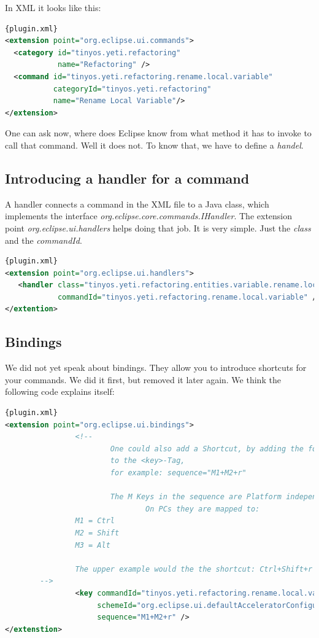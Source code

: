 \documentclass[a4paper,10pt]{report}
\begin{document}
In XML it looks like this:
\begin{lstlisting}[language=XML,caption=Creating a command ({\it plugin.xml})]{plugin.xml}
<extension point="org.eclipse.ui.commands">
  <category id="tinyos.yeti.refactoring"
            name="Refactoring" />
  <command id="tinyos.yeti.refactoring.rename.local.variable"
           categoryId="tinyos.yeti.refactoring"
           name="Rename Local Variable"/>
</extension>
\end{lstlisting}

One can ask now, where does Eclipse know from what method it has to invoke to call that command.
Well it does not. To know that, we have to define a {\it handel}.

\subsection{Introducing a handler for a command}
\label{commandHandler}
A handler connects a command in the XML file to a Java class, which implements the interface {\it org.eclipse.core.commands.IHandler}.
The extension point {\it org.eclipse.ui.handlers} helps doing that job. It is very simple. Just the {\it class} and the {\it commandId}.
\begin{lstlisting}[language=XML,caption=Connecting a command to a handler ({\it plugin.xml})]{plugin.xml}
<extension point="org.eclipse.ui.handlers">
   <handler class="tinyos.yeti.refactoring.entities.variable.rename.local.RenameLocalVariableActionHandler"
            commandId="tinyos.yeti.refactoring.rename.local.variable" />
</extention>
\end{lstlisting}

\subsection{Bindings}
We did not yet speak about bindings. They allow you to introduce shortcuts for your commands. We did it first, but removed it later again.
We think the following code explains itself:
\begin{lstlisting}[language=XML,caption=Introduce shortcuts ({\it plugin.xml})]{plugin.xml}
<extension point="org.eclipse.ui.bindings">
                <!--
                        One could also add a Shortcut, by adding the following Attribute
                        to the <key>-Tag,
                        for example: sequence="M1+M2+r"

                        The M Keys in the sequence are Platform independent keys.
                                On PCs they are mapped to:
                M1 = Ctrl
                M2 = Shift
                M3 = Alt

                The upper example would the the shortcut: Ctrl+Shift+r
		-->
                <key commandId="tinyos.yeti.refactoring.rename.local.variable"
                     schemeId="org.eclipse.ui.defaultAcceleratorConfiguration"
                     sequence="M1+M2+r" />
</extenstion>
\end{lstlisting}
\end{document}
